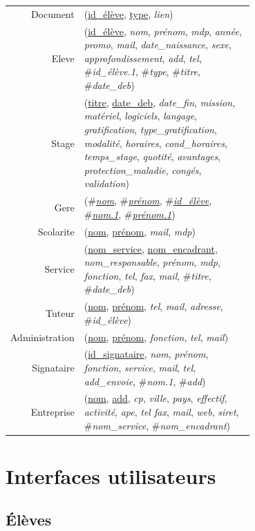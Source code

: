 \documentclass{scrreprt}
\newenvironment{mld}
  {\par\begin{minipage}{\linewidth}\begin{tabular}{rp{0.7\linewidth}}}
  {\end{tabular}\end{minipage}\par}
\newcommand{\attr}[1]{\emph{#1}}
\newcommand{\prim}[1]{\uline{#1}}
\newcommand{\foreign}[1]{\#\textsl{#1}}
\begin{document}
\begin{mld}
  Document & (\prim{id\_élève}, \prim{type}, \attr{lien})\\
  Eleve & (\prim{id\_élève}, \attr{nom}, \attr{prénom}, \attr{mdp}, \attr{année}, \attr{promo}, \attr{mail}, \attr{date\_naissance}, \attr{sexe}, \attr{approfondissement}, \attr{add}, \attr{tel}, \foreign{id\_élève.1}, \foreign{type}, \foreign{titre}, \foreign{date\_deb})\\
  Stage & (\prim{titre}, \prim{date\_deb}, \attr{date\_fin}, \attr{mission}, \attr{matériel}, \attr{logiciels}, \attr{langage}, \attr{gratification}, \attr{type\_gratification}, \attr{modalité}, \attr{horaires}, \attr{cond\_horaires}, \attr{temps\_stage}, \attr{quotité}, \attr{avantages}, \attr{protection\_maladie}, \attr{congés}, \attr{validation})\\
  Gere & (\foreign{\prim{nom}}, \foreign{\prim{prénom}}, \foreign{\prim{id\_élève}}, \foreign{\prim{nom.1}}, \foreign{\prim{prénom.1}})\\
  Scolarite & (\prim{nom}, \prim{prénom}, \attr{mail}, \attr{mdp})\\
  Service & (\prim{nom\_service}, \prim{nom\_encadrant}, \attr{nom\_responsable}, \attr{prénom}, \attr{mdp}, \attr{fonction}, \attr{tel}, \attr{fax}, \attr{mail}, \foreign{titre}, \foreign{date\_deb})\\
  Tuteur & (\prim{nom}, \prim{prénom}, \attr{tel}, \attr{mail}, \attr{adresse}, \foreign{id\_élève})\\
  Administration & (\prim{nom}, \prim{prénom}, \attr{fonction}, \attr{tel}, \attr{mail})\\
  Signataire & (\prim{id\_signataire}, \attr{nom}, \attr{prénom}, \attr{fonction}, \attr{service}, \attr{mail}, \attr{tel}, \attr{add\_envoie}, \foreign{nom.1}, \foreign{add})\\
  Entreprise & (\prim{nom}, \prim{add}, \attr{cp}, \attr{ville}, \attr{pays}, \attr{effectif}, \attr{activité}, \attr{ape}, \attr{tel fax}, \attr{mail}, \attr{web}, \attr{siret}, \foreign{nom\_service}, \foreign{nom\_encadrant})\\
\end{mld}

\newpage
\section{Interfaces utilisateurs}

\subsection{\'El\`eves}
\centering
\end{document}
